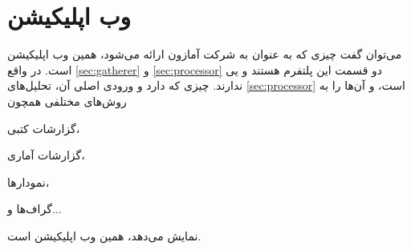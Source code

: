 \section{وب اپلیکیشن}\label{sec:web-app}
می‌توان گفت چیزی که به عنوان 
به شرکت آمازون ارائه می‌شود، همین وب ‌اپلیکیشن است.
در واقع 
\ref{sec:gatherer}
و
\ref{sec:processor}
دو قسمت 
این پلتفرم هستند و 
یی
ندارند. چیزی که 
دارد و ورودی اصلی آن، تحلیل‌های 
\ref{sec:processor}
است، و آن‌ها را به روش‌های مختلفی همچون
\begin{enumerate*}
\item 
گزارشات کتبی،
\item
گزارشات آماری،
\item 
نمودار‌ها،
\item 
گراف‌‌ها و...
\end{enumerate*}
نمایش می‌دهد، همین وب‌ اپلیکیشن است.

